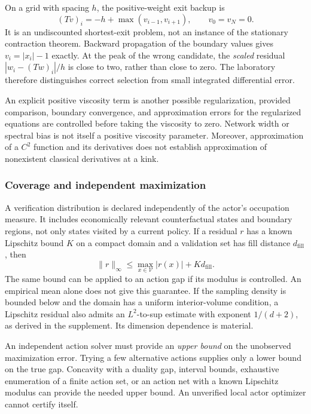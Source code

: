 On a grid with spacing $h$, the positive-weight exit backup is
\begin{equation}\label{eq:exit}
 (Tv)_i=-h+\max(v_{i-1},v_{i+1}),\qquad v_0=v_N=0.
\end{equation}
It is an undiscounted shortest-exit problem, not an instance of the stationary contraction theorem. Backward propagation of the boundary values gives $v_i=|x_i|-1$ exactly. At the peak of the wrong candidate, the \emph{scaled} residual $|w_i-(Tw)_i|/h$ is close to two, rather than close to zero. The laboratory therefore distinguishes correct selection from small integrated differential error.

An explicit positive viscosity term is another possible regularization, provided comparison, boundary convergence, and approximation errors for the regularized equations are controlled before taking the viscosity to zero. Network width or spectral bias is not itself a positive viscosity parameter. Moreover, approximation of a $C^2$ function and its derivatives does not establish approximation of nonexistent classical derivatives at a kink.

\subsubsection{Coverage and independent maximization}\label{sec:coverage}
A verification distribution is declared independently of the actor's occupation measure. It includes economically relevant counterfactual states and boundary regions, not only states visited by a current policy. If a residual $r$ has a known Lipschitz bound $K$ on a compact domain and a validation set has fill distance $d_\mathrm{fill}$, then
\begin{equation}\label{eq:cover}
 \|r\|_\infty\leq\max_{x\in\mathcal V}|r(x)|+K d_\mathrm{fill}.
\end{equation}
The same bound can be applied to an action gap if its modulus is controlled. An empirical mean alone does not give this guarantee. If the sampling density is bounded below and the domain has a uniform interior-volume condition, a Lipschitz residual also admits an $L^2$-to-sup estimate with exponent $1/(d+2)$, as derived in the supplement. Its dimension dependence is material.

An independent action solver must provide an \emph{upper bound} on the unobserved maximization error. Trying a few alternative actions supplies only a lower bound on the true gap. Concavity with a duality gap, interval bounds, exhaustive enumeration of a finite action set, or an action net with a known Lipschitz modulus can provide the needed upper bound. An unverified local actor optimizer cannot certify itself.


